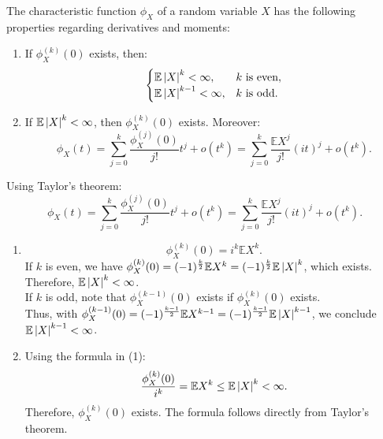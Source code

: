 \documentclass{huhtakm-template-book-v2}
\newcommand{\expect}{\mathbb{E}}
\begin{document}
    \begin{thm}
        The characteristic function $\phi_{X}$ of a random variable $X$ has the following properties regarding derivatives and moments:
        \begin{enumerate}
            \item If $\phi_{X}^{(k)}(0)$ exists, then:
            \begin{equation*}
                \begin{cases}
                    \expect\abs{X}^{k} < \infty, &k \text{ is even},\\
                    \expect\abs{X}^{k-1} < \infty, &k \text{ is odd}.
                \end{cases}
            \end{equation*}
            \item If $\expect\abs{X}^{k} < \infty$, then $\phi_{X}^{(k)}(0)$ exists. Moreover:
            \begin{equation*}
                \phi_{X}(t) = \sum_{j = 0}^{k}\frac{\phi_{X}^{(j)}(0)}{j!}t^{j}+o(t^{k}) = \sum_{j = 0}^{k}\frac{\expect{X^{j}}}{j!}(it)^{j}+o(t^{k}).
            \end{equation*}
        \end{enumerate}
    \end{thm}
    \begin{proofing}
        Using Taylor's theorem:
        \begin{equation*}
            \phi_{X}(t) = \sum_{j = 0}^{k}\frac{\phi_{X}^{(j)}(0)}{j!}t^{j}+o(t^{k}) = \sum_{j = 0}^{k}\frac{\expect{X^{j}}}{j!}(it)^{j}+o(t^{k}).
        \end{equation*}
        \begin{enumerate}
            \item 
            \begin{equation*}
                \phi_{X}^{(k)}(0) = i^{k}\expect{X^{k}}.
            \end{equation*}
            If $k$ is even, we have $\phi_{X}^{(k)}(0) = (-1)^{\frac{k}{2}}\expect{X^{k}} = (-1)^{\frac{k}{2}}\expect\abs{X}^{k}$, which exists. Therefore, $\expect\abs{X}^{k} < \infty$.\\
            If $k$ is odd, note that $\phi_{X}^{(k-1)}(0)$ exists if $\phi_{X}^{(k)}(0)$ exists.\\
            Thus, with $\phi_{X}^{(k-1)}(0) = (-1)^{\frac{k-1}{2}}\expect{X^{k-1}} = (-1)^{\frac{k-1}{2}}\expect\abs{X}^{k-1}$, we conclude $\expect\abs{X}^{k-1} < \infty$.
            \item Using the formula in (1):
            \begin{equation*}
                \frac{\phi_{X}^{(k)}(0)}{i^{k}} = \expect{X^{k}} \leq \expect\abs{X}^{k} < \infty.
            \end{equation*}
            Therefore, $\phi_{X}^{(k)}(0)$ exists. The formula follows directly from Taylor's theorem.
        \end{enumerate}
    \end{proofing}
\end{document}
